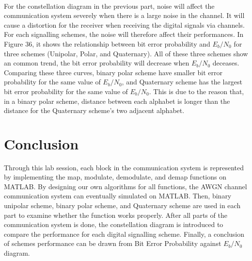 \documentclass[12pt]{article}
\begin{document}
    \paragraph{}
    For the constellation diagram in the previous part, noise will affect the communication system severely when there is a large noise in the channel. It will cause a distortion for the receiver when receiving the digital signals via channels. For each signalling schemes, the noise will therefore affect their performances. In Figure 36, it shows the relationship between bit error probability and $E_b/N_0$ for three schemes (Unipolar, Polar, and Quaternary). All of these three schemes show an common trend, the bit error probability will decrease when $E_b/N_0$ deceases. Comparing these three curves, binary polar scheme have smaller bit error probability for the same value of $E_b/N_0$, and Quaternary scheme has the largest bit error probability for the same value of $E_b/N_0$. This is due to the reason that, in a binary polar scheme, distance between each alphabet is longer than the distance for the Quaternary scheme's two adjacent alphabet. 
    
    
    
    
    
    
    \section{Conclusion}
    \paragraph{}
    Through this lab session, each block in the communication system is represented by implementing the map, modulate, demodulate, and demap functions on MATLAB. By designing our own algorithms for all functions, the AWGN channel communication system can eventually simulated on MATLAB. Then, binary unipolar scheme, binary polar scheme, and Quaternary scheme are used in each part to examine whether the function works properly. After all parts of the communication system is done, the constellation diagram is introduced to compare the performance for each digital signalling scheme. Finally, a conclusion of schemes performance can be drawn from Bit Error Probability against $E_b/N_0$ diagram.
    
    
    
    
    
    
    
    
    
    
    
\end{document}
